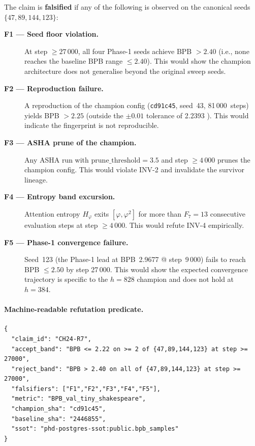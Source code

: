 The claim is \textbf{falsified} if any of the following is observed on the
canonical seeds $\{47, 89, 144, 123\}$:

\begin{description}
  \item[\textbf{F1 — Seed floor violation.}]  At step $\geq 27\,000$, all four
        Phase-1 seeds achieve BPB $> 2.40$ (i.e., none reaches the baseline
        BPB range $\leq 2.40$).  This would show the champion architecture does
        not generalise beyond the original sweep seeds.

  \item[\textbf{F2 — Reproduction failure.}]  A reproduction of the champion
        config (\texttt{cd91c45}, seed~43, 81\,000~steps) yields
        BPB $> 2.25$ (outside the $\pm 0.01$ tolerance of 2.2393
        \cite{trios_champion_repro}).  This would indicate the fingerprint is
        not reproducible.

  \item[\textbf{F3 — ASHA prune of the champion.}]  Any ASHA run with
        $\mathrm{prune\_threshold} = 3.5$ and step $\geq 4\,000$ prunes the
        champion config.  This would violate INV-2 and invalidate the
        survivor lineage.

  \item[\textbf{F4 — Entropy band excursion.}]  Attention entropy $H_\varphi$
        exits $[\varphi, \varphi^2]$ for more than $F_7 = 13$ consecutive
        evaluation steps at step $\geq 4\,000$.  This would refute INV-4
        empirically.

  \item[\textbf{F5 — Phase-1 convergence failure.}]  Seed~123 (the Phase-1
        lead at BPB~2.9677 @ step~9\,000) fails to reach BPB $\leq 2.50$ by
        step 27\,000.  This would show the expected convergence trajectory is
        specific to the $h = 828$ champion and does not hold at $h = 384$.
\end{description}

\paragraph{Machine-readable refutation predicate.}
\begin{verbatim}
{
  "claim_id": "CH24-R7",
  "accept_band": "BPB <= 2.22 on >= 2 of {47,89,144,123} at step >= 27000",
  "reject_band": "BPB > 2.40 on all of {47,89,144,123} at step >= 27000",
  "falsifiers": ["F1","F2","F3","F4","F5"],
  "metric": "BPB_val_tiny_shakespeare",
  "champion_sha": "cd91c45",
  "baseline_sha": "2446855",
  "ssot": "phd-postgres-ssot:public.bpb_samples"
}
\end{verbatim}

